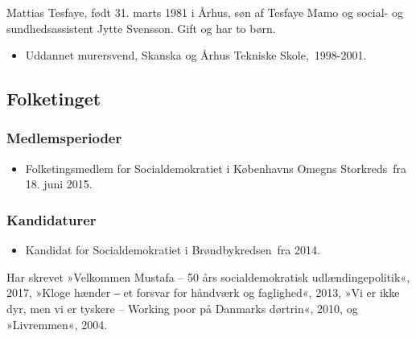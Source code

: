 \documentclass[11pt, a4paper]{awesome-cv}
\begin{document}
\makecvheader[R]
\makelettertitle
\begin{cvletter}
Mattias Tesfaye, født 31. marts 1981 i Århus, søn af Tesfaye Mamo og social- og sundhedsassistent Jytte Svensson. Gift og har to børn.

\begin{itemize}
\item Uddannet murersvend, Skanska og Århus Tekniske Skole, 1998-2001.
\end{itemize}
\subsection*{Folketinget}
\subsubsection*{Medlemsperioder}
\begin{itemize}
\item Folketingsmedlem for Socialdemokratiet i Københavns Omegns Storkreds fra 18. juni 2015.
\end{itemize}
\subsubsection*{Kandidaturer}
\begin{itemize}
\item Kandidat for Socialdemokratiet i Brøndbykredsen fra 2014.
\end{itemize}
Har skrevet »Velkommen Mustafa – 50 års socialdemokratisk udlændingepolitik«, 2017, »Kloge hænder ‒ et forsvar for håndværk og faglighed«, 2013, »Vi er ikke dyr, men vi er tyskere – Working poor på Danmarks dørtrin«, 2010, og »Livremmen«, 2004.

\end{cvletter}
\end{document}
